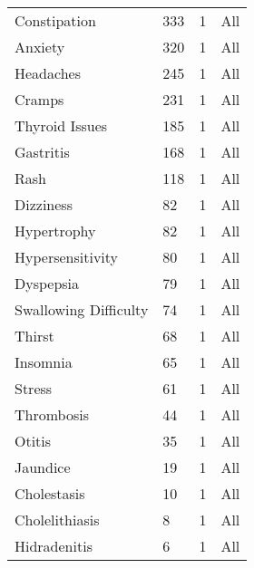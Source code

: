 \documentclass[referee,bst/sn-basic]{sn-jnl}%
\begin{document}
\begin{appendices}
\begin{longtable}{llll}
Constipation                             & 333       & 1    & All                     \\
Anxiety                                  & 320       & 1    & All                     \\
Headaches                                & 245       & 1    & All                     \\
Cramps                                   & 231       & 1    & All                     \\
Thyroid Issues                           & 185       & 1    & All                     \\
Gastritis                                & 168       & 1    & All                     \\
Rash                                     & 118       & 1    & All                     \\
Dizziness                                & 82        & 1    & All                     \\
Hypertrophy                              & 82        & 1    & All                     \\
Hypersensitivity                         & 80        & 1    & All                     \\
Dyspepsia                                & 79        & 1    & All                     \\
Swallowing Difficulty                    & 74        & 1    & All                     \\
Thirst                                   & 68        & 1    & All                     \\
Insomnia                                 & 65        & 1    & All                     \\
Stress                                   & 61        & 1    & All                     \\
Thrombosis                               & 44        & 1    & All                     \\
Otitis                                   & 35        & 1    & All                     \\
Jaundice                                 & 19        & 1    & All                     \\
Cholestasis                              & 10        & 1    & All                     \\
Cholelithiasis                           & 8         & 1    & All                     \\
Hidradenitis                             & 6         & 1    & All                     \\

\end{longtable}
\end{appendices}
\end{document}
